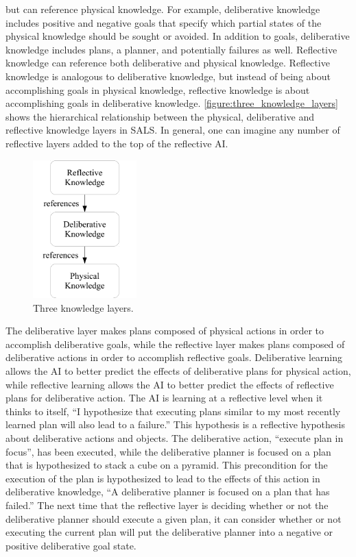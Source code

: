 but can reference physical knowledge.  For example, deliberative
knowledge includes positive and negative goals that specify which
partial states of the physical knowledge should be sought or avoided.
In addition to goals, deliberative knowledge includes plans, a
planner, and potentially failures as well.  Reflective knowledge can
reference both deliberative and physical knowledge.  Reflective
knowledge is analogous to deliberative knowledge, but instead of being
about accomplishing goals in physical knowledge, reflective knowledge
is about accomplishing goals in deliberative knowledge.
{\autoref{figure:three_knowledge_layers}} shows the hierarchical
relationship between the physical, deliberative and reflective
knowledge layers in SALS.  In general, one can imagine any number of
reflective layers added to the top of the reflective AI.
\begin{figure}
  \center
  \includegraphics[width=4cm]{gfx/three_knowledge_layers}
  \caption{Three knowledge layers.}
  \label{figure:three_knowledge_layers}
\end{figure}

The deliberative layer makes plans composed of physical actions in
order to accomplish deliberative goals, while the reflective layer
makes plans composed of deliberative actions in order to accomplish
reflective goals.  Deliberative learning allows the AI to better
predict the effects of deliberative plans for physical action, while
reflective learning allows the AI to better predict the effects of
reflective plans for deliberative action.  The AI is learning at a
reflective level when it thinks to itself, ``I hypothesize that
executing plans similar to my most recently learned plan will also
lead to a failure.''  This hypothesis is a reflective hypothesis about
deliberative actions and objects.  The deliberative action, ``execute
plan in focus'', has been executed, while the deliberative planner is
focused on a plan that is hypothesized to stack a cube on a pyramid.
This precondition for the execution of the plan is hypothesized to
lead to the effects of this action in deliberative knowledge, ``A
deliberative planner is focused on a plan that has failed.''  The next
time that the reflective layer is deciding whether or not the
deliberative planner should execute a given plan, it can consider
whether or not executing the current plan will put the deliberative
planner into a negative or positive deliberative goal state.

